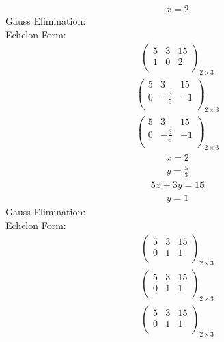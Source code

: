 \documentclass{article}
\begin{document}
\begin{align*}
x=2\end{align*}
Gauss Elimination:\\
Echelon Form:\\
\begin{align*}
\left(
\begin{array}{cc|c}
5 & 3 & 15\\
1 & 0 & 2\\
\end{array}
\right)_{2\times 3}
\end{align*}
\begin{align*}
\left(
\begin{array}{cc|c}
5 & 3 & 15\\
0 & -\frac{3}{5} & -1\\
\end{array}
\right)_{2\times 3}
\end{align*}
\begin{align*}
\left(
\begin{array}{cc|c}
5 & 3 & 15\\
0 & -\frac{3}{5} & -1\\
\end{array}
\right)_{2\times 3}
\end{align*}
\begin{align*}
x=2\end{align*}
\begin{align*}
y=\frac{5}{3}\end{align*}
\begin{align*}
5x + 3y=15\end{align*}
\begin{align*}
y=1\end{align*}
Gauss Elimination:\\
Echelon Form:\\
\begin{align*}
\left(
\begin{array}{cc|c}
5 & 3 & 15\\
0 & 1 & 1\\
\end{array}
\right)_{2\times 3}
\end{align*}
\begin{align*}
\left(
\begin{array}{cc|c}
5 & 3 & 15\\
0 & 1 & 1\\
\end{array}
\right)_{2\times 3}
\end{align*}
\begin{align*}
\left(
\begin{array}{cc|c}
5 & 3 & 15\\
0 & 1 & 1\\
\end{array}
\right)_{2\times 3}
\end{align*}
\end{document}
